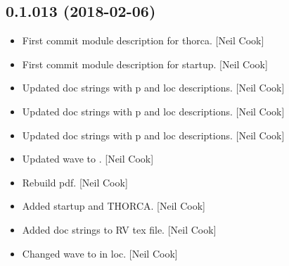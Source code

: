 \documentclass[a4paper,10pt,english]{report}
\begin{document}
\subsection{0.1.013 (2018-02-06)}
\label{\detokenize{misc/changelog:id491}}\begin{itemize}
\item {} 
First commit module description for thorca. {[}Neil Cook{]}

\item {} 
First commit module description for startup. {[}Neil Cook{]}

\item {} 
Updated doc strings with p and loc descriptions. {[}Neil Cook{]}

\item {} 
Updated doc strings with p and loc descriptions. {[}Neil Cook{]}

\item {} 
Updated doc strings with p and loc descriptions. {[}Neil Cook{]}

\item {} 
Updated wave to . {[}Neil Cook{]}

\item {} 
Rebuild pdf. {[}Neil Cook{]}

\item {} 
Added startup and THORCA. {[}Neil Cook{]}

\item {} 
Added doc strings to RV tex file. {[}Neil Cook{]}

\item {} 
Changed wave to  in loc. {[}Neil Cook{]}

\end{itemize}
\end{document}

